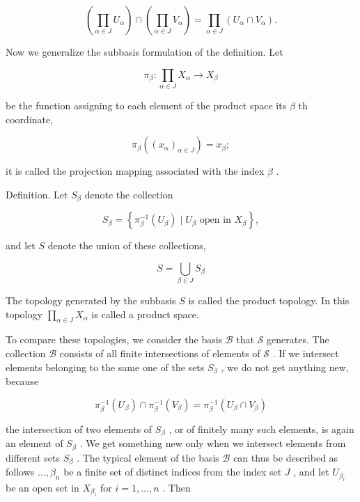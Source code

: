\[
\left( {\mathop{\prod }\limits_{{\alpha  \in  J}}{U}_{\alpha }}\right)  \cap  \left( {\mathop{\prod }\limits_{{\alpha  \in  J}}{V}_{\alpha }}\right)  = \mathop{\prod }\limits_{{\alpha  \in  J}}\left( {{U}_{\alpha } \cap  {V}_{\alpha }}\right) .
\]

Now we generalize the subbasis formulation of the definition. Let

\[
{\pi }_{\beta } : \mathop{\prod }\limits_{{\alpha  \in  J}}{X}_{\alpha } \rightarrow  {X}_{\beta }
\]

be the function assigning to each element of the product space its \(\beta\) th coordinate,

\[
{\pi }_{\beta }\left( {\left( {x}_{\alpha }\right) }_{\alpha  \in  J}\right)  = {x}_{\beta };
\]

it is called the projection mapping associated with the index \(\beta\) .

Definition. Let \({S}_{\beta }\) denote the collection

\[
{S}_{\beta } = \left\{  {{\pi }_{\beta }^{-1}\left( {U}_{\beta }\right)  \mid  {U}_{\beta }\text{ open in }{X}_{\beta }}\right\}  ,
\]

and let \(S\) denote the union of these collections,

\[
S = \mathop{\bigcup }\limits_{{\beta  \in  J}}{S}_{\beta }
\]

The topology generated by the subbasis \(S\) is called the product topology. In this topology \(\mathop{\prod }\limits_{{\alpha  \in  J}}{X}_{\alpha }\) is called a product space.

To compare these topologies, we consider the basis \(\mathcal{B}\) that \(\mathcal{S}\) generates. The collection \(\mathcal{B}\) consists of all finite intersections of elements of \(\mathcal{S}\) . If we intersect elements belonging to the same one of the sets \({S}_{\beta }\) , we do not get anything new, because

\[
{\pi }_{\beta }^{-1}\left( {U}_{\beta }\right)  \cap  {\pi }_{\beta }^{-1}\left( {V}_{\beta }\right)  = {\pi }_{\beta }^{-1}\left( {{U}_{\beta } \cap  {V}_{\beta }}\right)
\]

the intersection of two elements of \({S}_{\beta }\) , or of finitely many such elements, is again an element of \({S}_{\beta }\) . We get something new only when we intersect elements from different sets \({S}_{\beta }\) . The typical element of the basis \(\mathcal{B}\) can thus be described as follows \(\ldots ,{\beta }_{n}\) be a finite set of distinct indices from the index set \(J\) , and let \({U}_{{\beta }_{i}}\) be an open set in \({X}_{{\beta }_{i}}\) for \(i = 1,\ldots ,n\) . Then

